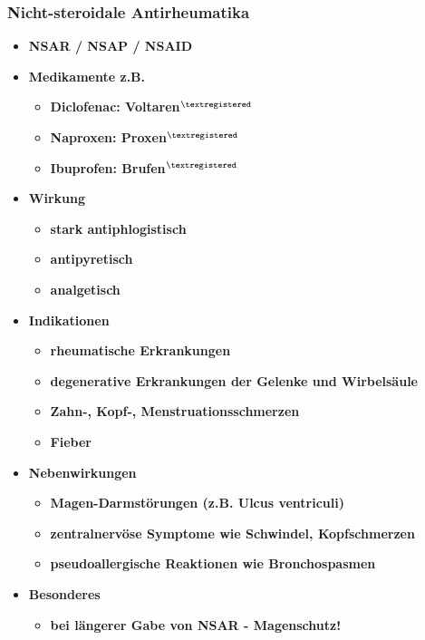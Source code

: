 \subsubsection{Nicht-steroidale Antirheumatika}
	\begin{itemize}
		\item \textbf{NSAR / NSAP / NSAID}
		\item \textbf{Medikamente z.B.}
			\begin{itemize}
				\item \textbf{Diclofenac: Voltaren$^{\textregistered}$}
				\item \textbf{Naproxen: Proxen$^{\textregistered}$}
				\item \textbf{Ibuprofen: Brufen$^{\textregistered}$}
			\end{itemize}
		\item \textbf{Wirkung}
			\begin{itemize}
				\item \textbf{stark antiphlogistisch}
				\item \textbf{antipyretisch}
				\item \textbf{analgetisch}
			\end{itemize}
		\item \textbf{Indikationen}
			\begin{itemize}
				\item \textbf{rheumatische Erkrankungen}
				\item \textbf{degenerative Erkrankungen der Gelenke und Wirbelsäule}
				\item \textbf{Zahn-, Kopf-, Menstruationsschmerzen}
				\item \textbf{Fieber}
			\end{itemize}
		\item \textbf{Nebenwirkungen}
			\begin{itemize}
				\item \textbf{Magen-Darmstörungen (z.B. Ulcus ventriculi)}
				\item \textbf{zentralnervöse Symptome wie Schwindel, Kopfschmerzen}
				\item \textbf{pseudoallergische Reaktionen wie Bronchospasmen}
			\end{itemize}
		\item \textbf{Besonderes}
			\begin{itemize}
				\item \textbf{bei längerer Gabe von NSAR - Magenschutz!}
			\end{itemize}
	\end{itemize}
		
